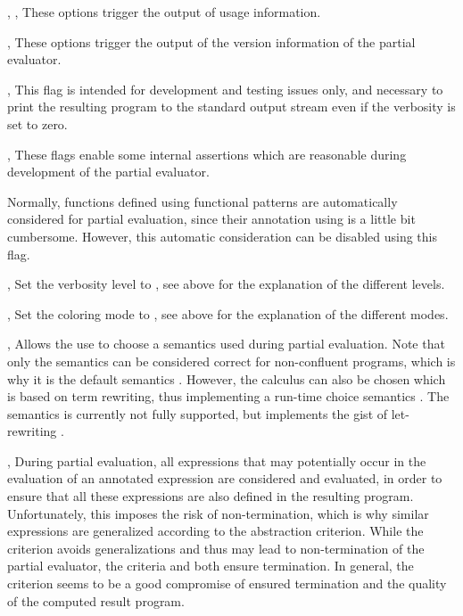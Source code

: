 \begin{description}
\item{, , }
These options trigger the output of usage information.

\item{, }
These options trigger the output of the version information
of the partial evaluator.

\item{, }
This flag is intended for development and testing issues only,
and necessary to print the resulting program to the standard output
stream even if the verbosity is set to zero.

\item{, }
These flags enable some internal assertions which are reasonable
during development of the partial evaluator.

\item{}
Normally, functions defined using functional patterns are automatically
considered for partial evaluation, since their annotation using 
is a little bit cumbersome.
However, this automatic consideration can be disabled using this flag.

\item{, }
Set the verbosity level to , see above for the explanation
of the different levels.

\item{, }
Set the coloring mode to , see above for the explanation
of the different modes.

\item{, }
Allows the use to choose a semantics used during partial evaluation.
Note that only the  semantics can be considered correct
for non-confluent programs, which is why it is the default semantics
\cite{Peemoeller2016}.
However, the  calculus can also be chosen which is based
on term rewriting, thus implementing a run-time choice semantics
\cite{AlbertHanusVidal02JFLP}.
The  semantics is currently not fully supported,
but implements the gist of let-rewriting \cite{Lopez-Fraguas07}.

\item{, }
During partial evaluation, all expressions that may potentially
occur in the evaluation of an annotated expression are considered and
evaluated, in order to ensure that all these expressions are also
defined in the resulting program.
Unfortunately, this imposes the risk of non-termination,
which is why similar expressions are generalized according to the
abstraction criterion.
While the  criterion avoids generalizations
and thus may lead to non-termination of the partial evaluator,
the criteria  and  both ensure termination.
In general, the criterion  seems to be a good compromise
of ensured termination and the quality of the computed result program.


\end{description}
